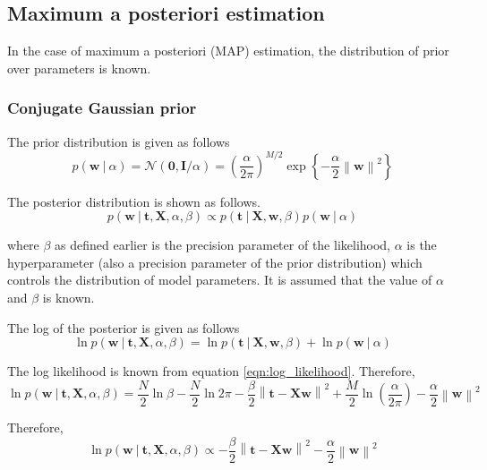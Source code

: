 \documentclass[11pt]{article}
\newcommand{\eye}{\bm{I}}
\newcommand\given[1][]{\:#1\vert\:}
\newcommand{\norm}[1]{\left\lVert#1\right\rVert}
\begin{document}
\subsection{Maximum a posteriori estimation}

In the case of maximum a posteriori (MAP) estimation, the distribution of prior over parameters is known. 

\subsubsection{Conjugate Gaussian prior}

The prior distribution is given as follows
\begin{equation} \label{prior_alpha}
    p(\bm{w} \given \alpha) = \mathcal N(\bm 0, \eye /\alpha) = \left( \frac{\alpha}{2\pi}\right)^{M/2} \exp{\left\{ -\frac{\alpha}{2}\norm{\bm{w}}^2\right\}}
\end{equation}

The posterior distribution is shown as follows.
\begin{equation}
    p(\bm{w} \given \bm{t}, \bm{X}, \alpha, \beta) \propto p(\bm{t} \given \bm{X}, \bm{w}, \beta) p(\bm{w} \given \alpha)
\end{equation}

where $\beta$ as defined earlier is the precision parameter of the likelihood, $\alpha$ is the hyperparameter (also a precision parameter of the prior distribution) which controls the distribution of model parameters. It is assumed that the value of $\alpha$ and $\beta$ is known.

The log of the posterior is given as follows
\begin{equation}
    \ln{p(\bm{w} \given \bm{t}, \bm{X}, \alpha, \beta)} = 
    \ln{p(\bm{t} \given \bm{X}, \bm{w}, \beta)} + \ln{p(\bm{w} \given \alpha)}
\end{equation}

The log likelihood is known from equation \ref{eqn:log_likelihood}. Therefore, 
\begin{equation} \label{eqn:log_posterior}
    \ln{p(\bm{w} \given \bm{t}, \bm{X}, \alpha, \beta)} = \frac{N}{2}\ln{\beta} - \frac{N}{2}\ln{2\pi} - \frac{\beta}{2} \norm{\bm{t} - \bm{Xw}}^2 + \frac{M}{2} \ln{\left( \frac{\alpha}{2\pi} \right)} - \frac{\alpha}{2}\norm{\bm{w}}^2
\end{equation}

Therefore,
\begin{equation}
    \ln{p(\bm{w} \given \bm{t}, \bm{X}, \alpha, \beta)} \propto - \frac{\beta}{2} \norm{\bm{t} - \bm{Xw}}^2 - \frac{\alpha}{2}\norm{\bm{w}}^2
\end{equation}
\end{document}
